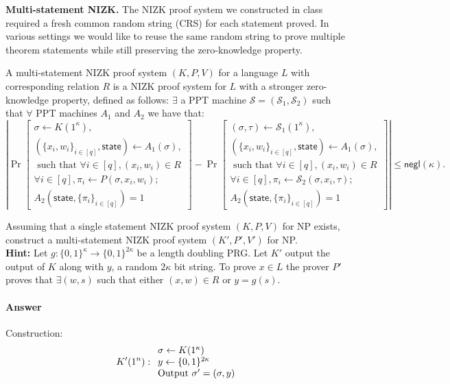 \documentclass[12pt]{tufte-book}
\begin{document}
\begin{exercise}
\textbf{Multi-statement NIZK.} The NIZK proof system we constructed in class required a fresh common random string (CRS) for each statement proved. In various settings we would like to reuse the same random string to prove multiple theorem statements while still preserving the zero-knowledge property.

    A multi-statement NIZK proof system $(K,P,V)$ for a language $L$ with corresponding relation $R$ is a NIZK proof system for $L$ with a stronger zero-knowledge property, defined as follows: $\exists$ a PPT machine $\mathcal{S} = (\mathcal{S}_1,\mathcal{S}_2)$ such that $\forall$ PPT machines $A_1$ and $A_2$ we have that:
    \[\left|\Pr\left[\begin{split}\sigma \gets K(1^\kappa),\\ (\{x_i,w_i\}_{i \in [q]},\textsf{state}) \gets A_1(\sigma),\\ \text{ such that } \forall i \in [q], (x_i,w_i)\in R\\\forall i \in [q],  \pi_i \gets P(\sigma, x_i,w_i);\\
    A_2(\textsf{state}, \{\pi_i\}_{i \in [q]}) =1\end{split}\right]
    -
    \Pr\left[\begin{split}(\sigma,\tau) \gets \mathcal{S}_1(1^\kappa),\\ (\{x_i,w_i\}_{i \in [q]},\textsf{state}) \gets A_1(\sigma),\\\text{ such that } \forall i \in [q], (x_i,w_i)\in R\\\forall i \in [q],  \pi_i \gets \mathcal{S}_2(\sigma, x_i,\tau);\\ A_2(\textsf{state}, \{\pi_i\}_{i \in [q]})=1\end{split}\right]\right|
    \leq \textsf{negl}(\kappa).
    \]

    Assuming that a single statement NIZK proof system $(K,P,V)$ for NP exists, construct a multi-statement NIZK proof system $(K',P',V')$ for NP.\\
\textbf{Hint:} Let $g: \{0,1\}^\kappa \rightarrow \{0,1\}^{2\kappa}$ be a length doubling PRG. Let $K'$ output the output of $K$ along with $y$, a random $2\kappa$ bit string. To prove $x \in L$ the prover $P'$ proves that $\exists (w,s)$ such that either $(x,w)\in R$ or $y = g(s)$.
\end{exercise}


\paragraph{Answer}
Construction:
\[ K'(1^n): 
\begin{array}{l l} 
\sigma \leftarrow K(1^{\kappa}) \\  
y \leftarrow \{0,1\}^{2\kappa} \\
\text{Output } \sigma' = (\sigma, y) \\
\end{array} \]
\end{document}
